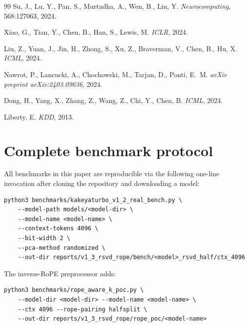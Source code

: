 \documentclass[11pt,a4paper]{article}
\theoremstyle{definition}
\theoremstyle{plain}
\begin{document}
\begin{thebibliography}{99}
Su, J., Lu, Y., Pan, S., Murtadha, A., Wen, B., Liu, Y.
\newblock \emph{Neurocomputing}, 568:127063, 2024.

Xiao, G., Tian, Y., Chen, B., Han, S., Lewis, M.
\newblock \emph{ICLR}, 2024.

Liu, Z., Yuan, J., Jin, H., Zhong, S., Xu, Z., Braverman, V., Chen, B., Hu, X.
\newblock \emph{ICML}, 2024.

Nawrot, P., Lancucki, A., Chochowski, M., Tarjan, D., Ponti, E.~M.
\newblock \emph{arXiv preprint arXiv:2403.09636}, 2024.

Dong, H., Yang, X., Zhang, Z., Wang, Z., Chi, Y., Chen, B.
\newblock \emph{ICML}, 2024.

Liberty, E.
\newblock \emph{KDD}, 2013.

\end{thebibliography}

\appendix

\section{Complete benchmark protocol}
\label{app:protocol}

All benchmarks in this paper are reproducible via the following one-line invocation after cloning the repository and downloading a model:
\begin{verbatim}
python3 benchmarks/kakeyaturbo_v1_2_real_bench.py \
    --model-path models/<model-dir> \
    --model-name <model-name> \
    --context-tokens 4096 \
    --bit-width 2 \
    --pca-method randomized \
    --out-dir reports/v1_3_rsvd_rope/bench/<model>_rsvd_half/ctx_4096
\end{verbatim}
The inverse-RoPE preprocessor adds:
\begin{verbatim}
python3 benchmarks/rope_aware_k_poc.py \
    --model-dir <model-dir> --model-name <model-name> \
    --ctx 4096 --rope-pairing halfsplit \
    --out-dir reports/v1_3_rsvd_rope/rope_poc/<model-name>
\end{verbatim}
\end{document}
